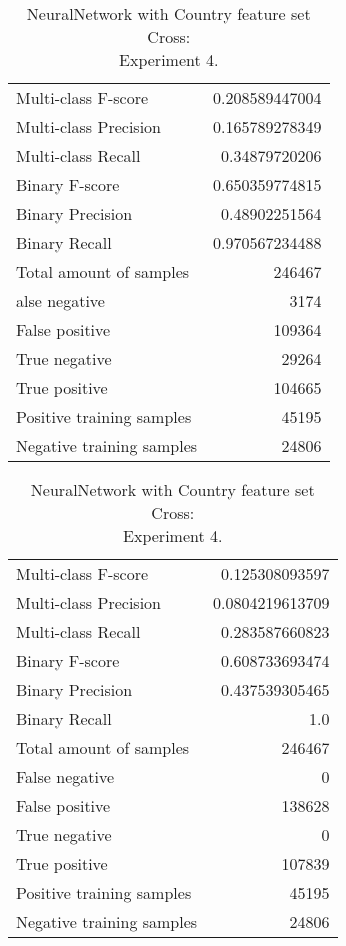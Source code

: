 \begin{table}[H]
\begin{minipage}{0.5\textwidth}
\caption{NeuralNetwork with Country feature set Cross: \\Experiment 3.}
\centering
\begin{tabular}{l r}
\toprule
Multi-class F-score & 0.208589447004 \\
Multi-class Precision & 0.165789278349 \\
Multi-class Recall & 0.34879720206 \\
\midrule
Binary F-score & 0.650359774815 \\
Binary Precision & 0.48902251564 \\
Binary Recall & 0.970567234488 \\
\midrule
Total amount of samples & 246467 \\
alse negative & 3174 \\
False positive & 109364 \\
True negative & 29264 \\
True positive & 104665 \\
\midrule
Positive training samples & 45195 \\
Negative training samples & 24806 \\
\bottomrule
\end{tabular}
\end{minipage}
\hfillx
\begin{minipage}{0.5\textwidth}
\caption{NeuralNetwork with Country feature set Cross: \\Experiment 4.}
\centering
\begin{tabular}{l r}
\toprule
Multi-class F-score & 0.125308093597 \\
Multi-class Precision & 0.0804219613709 \\
Multi-class Recall & 0.283587660823 \\
\midrule
Binary F-score & 0.608733693474 \\
Binary Precision & 0.437539305465 \\
Binary Recall & 1.0 \\
\midrule
Total amount of samples & 246467 \\
False negative & 0 \\
False positive & 138628 \\
True negative & 0 \\
True positive & 107839 \\
\midrule
Positive training samples & 45195 \\
Negative training samples & 24806 \\
\bottomrule
\end{tabular}
\end{minipage}
\end{table}
